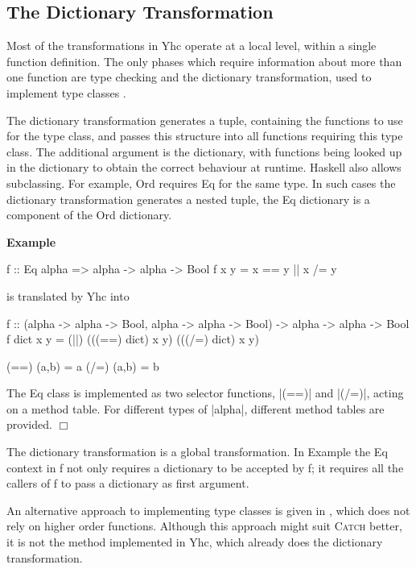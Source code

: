\documentclass[preprint]{sigplanconf}
\let\cite=\citep
\newcommand{\C}[1]{\textsf{#1}}
\newcommand{\catch}{\textsc{Catch}}
\newcounter{exmp}
\newcommand{\yesexample}{\addtocounter{exmp}{1}\addvspace{2mm}\noindent\textbf{Example \arabic{exmp}}}
\newcommand{\noexample}{\hfill$\Box$\par\addvspace{2mm}}
\newcommand{\lastexample}{\arabic{exmp}}
\newenvironment{example}{\yesexample}{\noexample}
\begin{document}
\subsection{The Dictionary Transformation}
\label{sec:dict}

Most of the transformations in Yhc operate at a local level, within a single function definition. The only phases which require information about more than one function are type checking and the dictionary transformation, used to implement type classes \citep{wadler:type_classes}.

The dictionary transformation generates a tuple, containing the functions to use for the type class, and passes this structure into all functions requiring this type class. The additional argument is the dictionary, with functions being looked up in the dictionary to obtain the correct behaviour at runtime. Haskell also allows subclassing. For example, \C{Ord} requires \C{Eq} for the same type. In such cases the dictionary transformation generates a nested tuple, the \C{Eq} dictionary is a component of the \C{Ord} dictionary.

\begin{example}
\begin{code}
f :: Eq alpha => alpha -> alpha -> Bool
f x y = x == y || x /= y
\end{code}

\noindent is translated by Yhc into

\begin{code}
f :: (alpha -> alpha -> Bool, alpha -> alpha -> Bool) -> alpha -> alpha -> Bool
f dict x y = (||) (((==) dict) x y) (((/=) dict) x y)

(==) (a,b) = a
(/=) (a,b) = b
\end{code}

The \C{Eq} class is implemented as two selector functions, |(==)| and |(/=)|, acting on a method table. For different types of |alpha|, different method tables are provided.
\end{example}

The dictionary transformation is a global transformation. In Example \lastexample{} the \C{Eq} context in \C{f} not only requires a dictionary to be accepted by \C{f}; it requires all the callers of \C{f} to pass a dictionary as first argument.

An alternative approach to implementing type classes is given in \cite{jones:dictionary_free}, which does not rely on higher order functions. Although this approach might suit \catch{} better, it is not the method implemented in Yhc, which already does the dictionary transformation.
\end{document}
